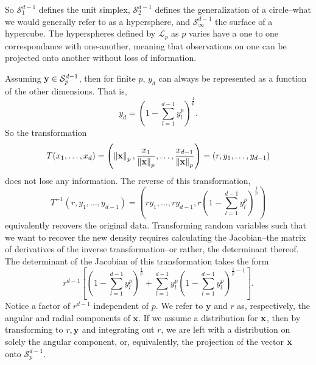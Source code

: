 So $\mathcal{S}_{1}^{d-1}$ defines the unit simplex, $\mathcal{S}_{2}^{d-1}$ defines the generalization
  of a circle--what we would generally refer to as a hypersphere, and $\mathcal{S}_{\infty}^{d-1}$
  the surface of a hypercube. The hyperspheres defined by $\mathcal{L}_p$ as $p$ varies have a one
  to one correspondance with one-another, meaning that observations on one can be projected onto
  another without loss of information.

Assuming ${\bf y} \in \mathcal{S}_{p}^{d-1}$, then for finite $p$, $y_d$ can always be represented
  as a function of the other dimensions.  That is,
  \begin{equation*}
    y_d = \left(1 - \sum_{l = 1}^{d-1}y_l^p\right)^{\frac{1}{p}}.
  \end{equation*}
  So the transformation
  \begin{equation}
    \label{eqn:pnormt}
    T(x_1,\ldots,x_d) = \left(\left\lVert {\bf x} \right\rVert_{p}, \frac{x_1}{\left\lVert {\bf x} \right\rVert_{p}},
                          \ldots , \frac{x_{d-1}}{\left\lVert {\bf x} \right\rVert_{p}}\right) = (r,y_1,\ldots,y_{d-1})
  \end{equation}
  does not lose any information.  The reverse of this transformation,
  \begin{equation}
    \label{eqn:pnormtinv}
    T^{-1}\left(r,y_1,\ldots,y_{d-1}\right) =
      \left(ry_1,\ldots,ry_{d-1}, r\left(1 - {\scriptstyle\sum}_{l = 1}^{d-1}y_l^p\right)^{\frac{1}{p}}\right)
  \end{equation}
  equivalently recovers the original data.  Transforming random variables such that we want to recover
  the new density requires calculating the Jacobian--the matrix of derivatives of the inverse
  transformation--or rather, the determinant thereof.  The determinant of the Jacobian of this
  transformation takes the form
  \begin{equation}
    \label{eqn:pnormjac}
    r^{d-1}\left[\left(1 - \sum_{l = 1}^{d-1}y_l^p\right)^{\frac{1}{p}} +
        \sum_{l = 1}^{d-1}y_l^p\left(1 - \sum_{l=1}^{d-1} y_l^p\right)^{\frac{1}{p} - 1}\right].
  \end{equation}
  Notice a factor of $r^{d-1}$ independent of $p$. We refer to $\bm{y}$ and $r$ as, respectively,
  the angular and radial components of $\bm{x}$.  If we assume a distribution for ${\bf x}$, then
  by transforming to $r, {\bf y}$ and integrating out $r$, we are left with a distribution on solely
  the angular component, or, equivalently, the projection of the vector ${\bf x}$ onto
  $\mathcal{S}_{p}^{d-1}$.

